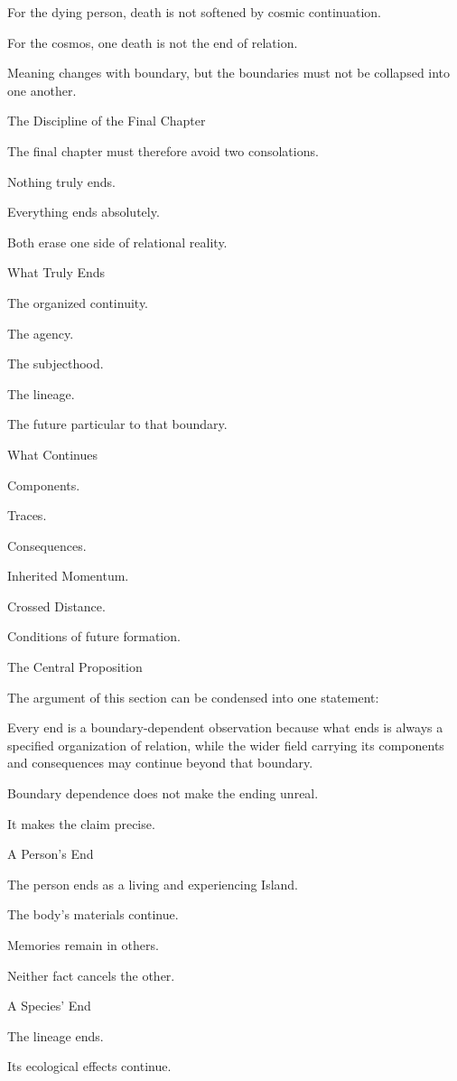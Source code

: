For the dying person, death is not softened by cosmic continuation.

For the cosmos, one death is not the end of relation.

Meaning changes with boundary, but the boundaries must not be collapsed into one another.

The Discipline of the Final Chapter

The final chapter must therefore avoid two consolations.

Nothing truly ends.

Everything ends absolutely.

Both erase one side of relational reality.

What Truly Ends

The organized continuity.

The agency.

The subjecthood.

The lineage.

The future particular to that boundary.

What Continues

Components.

Traces.

Consequences.

Inherited Momentum.

Crossed Distance.

Conditions of future formation.

The Central Proposition

The argument of this section can be condensed into one statement:

Every end is a boundary-dependent observation because what ends is always a specified organization of relation, while the wider field carrying its components and consequences may continue beyond that boundary.

Boundary dependence does not make the ending unreal.

It makes the claim precise.

A Person’s End

The person ends as a living and experiencing Island.

The body’s materials continue.

Memories remain in others.

Neither fact cancels the other.

A Species’ End

The lineage ends.

Its ecological effects continue.

